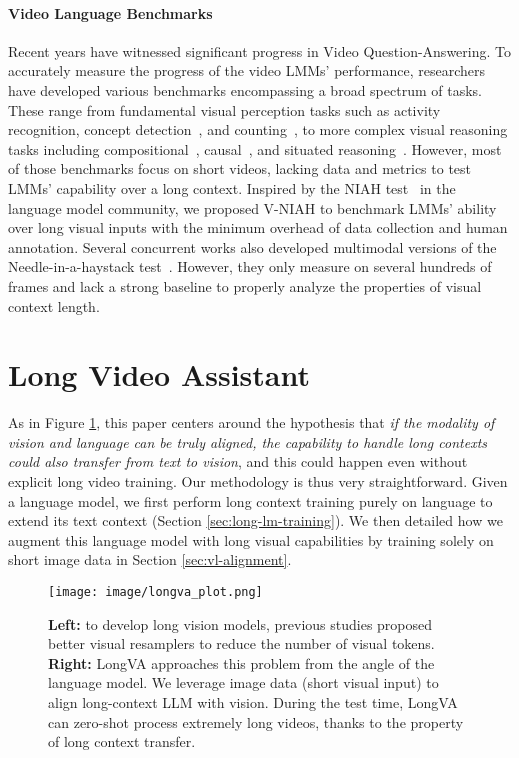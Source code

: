 \paragraph{Video Language Benchmarks}
Recent years have witnessed significant progress in Video Question-Answering\cite{antol2015vqa}.
To accurately measure the progress of the video LMMs' performance, researchers have developed various benchmarks encompassing a broad spectrum of tasks. These range from fundamental visual perception tasks such as activity recognition\cite{yu2019activitynet}, concept detection~\cite{xu2017video}, and counting~\cite{jang2017tgif}, to more complex visual reasoning tasks including compositional~\cite{grunde2021agqa}, causal~\cite{xiao2021next,yi2019clevrer,xu2021sutd}, and situated reasoning~\cite{wu2021star}. 
However, most of those benchmarks focus on short videos, lacking data and metrics to test LMMs' capability over a long context. Inspired by the NIAH test~\citep{niah} in the language model community, we proposed V-NIAH to benchmark LMMs' ability over long visual inputs with the minimum overhead of data collection and human annotation. Several concurrent works also developed multimodal versions of the Needle-in-a-haystack test~\cite{wang2024needle,zhou2024mlvu,song2024milebenchbenchmarkingmllmslong, wang2024multimodalneedlehaystackbenchmarking}. However, they only measure on several hundreds of frames and lack a strong baseline to properly analyze the properties of visual context length.
\section{Long Video Assistant}

As in Figure \ref{fig:longva_plot_main}, this paper centers around the hypothesis that \textit{if the modality of vision and language can be truly aligned, the capability to handle long contexts could also transfer from text to vision}, and this could happen even without explicit long video training. Our methodology is thus very straightforward. Given a language model, we first perform long context training purely on language to extend its text context (Section \ref{sec:long-lm-training}). We then detailed how we augment this language model with long visual capabilities by training solely on short image data in Section \ref{sec:vl-alignment}.

\begin{figure}[t]
    \centering
    \texttt{[image: image/longva\_plot.png]}
    \caption{\textbf{Left:} to develop long vision models,  previous studies proposed better visual resamplers to reduce the number of visual tokens. \textbf{Right:} LongVA approaches this problem from the angle of the language model. We leverage image data (short visual input) to align long-context LLM with vision. During the test time, LongVA can zero-shot process extremely long videos, thanks to the property of long context transfer.}
    \label{fig:longva_plot_main}
\end{figure}

